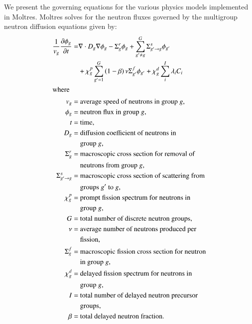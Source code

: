 We present the governing equations for the various physics models implemented
in Moltres. Moltres solves for the neutron fluxes governed by
the multigroup neutron diffusion equations given by:
%
\begin{align}
    \frac{1}{v_g} \frac{\partial \phi_g}{\partial t} =& \nabla \cdot D_g
    \nabla \phi_g - \Sigma^r_g \phi_g +
    \sum^G_{g' \neq g} \Sigma^s_{g' \rightarrow g} \phi_{g'} \nonumber \\
    &+ \chi^p_g \sum^G_{g'=1} \left( 1-\beta \right) \nu \Sigma^f_{g'}
    \phi_{g'} + \chi^d_g \sum^I_i \lambda_i C_i \label{eq:neut} \\
    \shortintertext{where}
    v_g =& \text{ average speed of neutrons in group $g$,} 
    \nonumber \\
    \phi_g =& \text{ neutron flux in group $g$,}
    \nonumber \\
    t =& \text{ time,} \nonumber \\
    D_g =& \text{ diffusion coefficient of neutrons in} \nonumber \\
    &\text{ group $g$,} \nonumber \\
    \Sigma^r_g =& \text{ macroscopic cross section for removal of} \nonumber \\
    &\text{ neutrons from group $g$,} \nonumber \\
    \Sigma^s_{g' \rightarrow g} =& \text{ macroscopic cross section of
    scattering from} \nonumber \\
    &\text{ groups $g'$ to $g$,} \nonumber \\
    \chi^p_g =& \text{ prompt fission spectrum for neutrons in} \nonumber \\
    &\text{ group $g$,} \nonumber \\
    G =& \text{ total number of discrete neutron groups,} \nonumber \\
    \nu =& \text{ average number of neutrons produced per} \nonumber \\
    &\text{ fission,} \nonumber \\
    \Sigma^f_{g} =& \text{ macroscopic fission cross section for neutron}
    \nonumber \\
    &\text{ in group $g$,} \nonumber \\
    \chi^d_g =& \text{ delayed fission spectrum for neutrons in} \nonumber \\
    &\text{ group $g$,} \nonumber \\
    I =& \text{ total number of delayed neutron precursor} \nonumber \\
    &\text{ groups,} \nonumber \\
    \beta =& \text{ total delayed neutron fraction.} \nonumber
\end{align}

